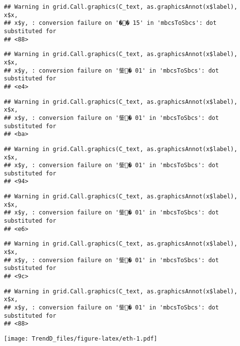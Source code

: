 \documentclass[]{article}
\begin{document}
\begin{verbatim}
## Warning in grid.Call.graphics(C_text, as.graphicsAnnot(x$label), x$x,
## x$y, : conversion failure on '�� 15' in 'mbcsToSbcs': dot substituted for
## <88>
\end{verbatim}

\begin{verbatim}
## Warning in grid.Call.graphics(C_text, as.graphicsAnnot(x$label), x$x,
## x$y, : conversion failure on '鈭� 01' in 'mbcsToSbcs': dot substituted for
## <e4>
\end{verbatim}

\begin{verbatim}
## Warning in grid.Call.graphics(C_text, as.graphicsAnnot(x$label), x$x,
## x$y, : conversion failure on '鈭� 01' in 'mbcsToSbcs': dot substituted for
## <ba>
\end{verbatim}

\begin{verbatim}
## Warning in grid.Call.graphics(C_text, as.graphicsAnnot(x$label), x$x,
## x$y, : conversion failure on '鈭� 01' in 'mbcsToSbcs': dot substituted for
## <94>
\end{verbatim}

\begin{verbatim}
## Warning in grid.Call.graphics(C_text, as.graphicsAnnot(x$label), x$x,
## x$y, : conversion failure on '鈭� 01' in 'mbcsToSbcs': dot substituted for
## <e6>
\end{verbatim}

\begin{verbatim}
## Warning in grid.Call.graphics(C_text, as.graphicsAnnot(x$label), x$x,
## x$y, : conversion failure on '鈭� 01' in 'mbcsToSbcs': dot substituted for
## <9c>
\end{verbatim}

\begin{verbatim}
## Warning in grid.Call.graphics(C_text, as.graphicsAnnot(x$label), x$x,
## x$y, : conversion failure on '鈭� 01' in 'mbcsToSbcs': dot substituted for
## <88>
\end{verbatim}

\texttt{[image: TrendD\_files/figure-latex/eth-1.pdf]}
\end{document}
